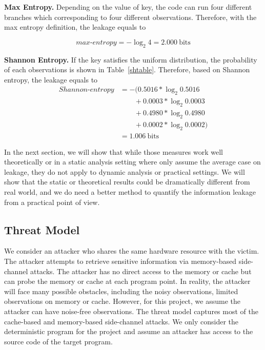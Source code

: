 \textbf{Max Entropy.} 
Depending on the value of key, the code can run four different branches which corresponding to 
four different observations. Therefore, with the max entropy definition, the leakage equals to 

\begin{displaymath}
    \mathit{max\text{-}entropy} = -\log_2{4} = 2.000\ \mathrm{bits}
\end{displaymath}

\vspace{3pt}
\textbf{Shannon Entropy.}
If the key satisfies the uniform distribution, the probability of each observations
is shown in Table~\ref{shtable}.  
Therefore, based on Shannon entropy, the leakage equals to 
\begin{align*}
  \mathit{Shannon\text{-}entropy} &= -(0.5016*\log_{2}0.5016\\
  &\qquad+ 0.0003*\log_{2}0.0003 \\
  &\qquad+ 0.4980*\log_{2}0.4980 \\
  &\qquad+ 0.0002*\log_{2}0.0002) \\
  &= 1.006\ \mathrm{bits}
\end{align*}

In the next section, we will show that while those measures work well
theoretically or in a static analysis setting where only assume the
average case on leakage, they do not apply to dynamic analysis or
practical settings. We will show that the static or theoretical results could
be dramatically different from real world, and we do need a better
method to quantify the information leakage from a practical point of view.

\subsection{Threat Model}
We consider an attacker who shares the same hardware resource with the victim. 
The attacker attempts to retrieve sensitive information via memory-based 
side-channel attacks. 
The attacker has no direct access to the memory or cache but can probe the 
memory or cache at each program point. In reality, the attacker will face 
many possible obstacles,
including the noisy observations, limited observations on memory or cache.
However, for this project, we assume the attacker can have noise-free observations. 
The threat model captures most of the cache-based and memory-based side-channel attacks.
We only consider the deterministic program for the project and assume an attacker has
access to the source code of the target program.
